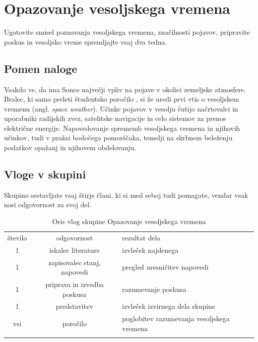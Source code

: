 %
\chapter{Opazovanje vesoljskega vremena }
\label{Vaje:VesVrem} %

Ugotovite smisel poznavanja vesoljskega vremena, značilnosti pojavov, pripravite poskus in vesoljsko vreme spremljajte vsaj dva tedna.

\section{Pomen naloge}
\label{sec:VesVremPomen}
 Vsakdo ve, da ima Sonce največji vpliv na pojave v okolici zemeljske atmosfere. Bralec, ki samo preleti študentsko poročilo \cite{VesVreme_2014}, si že uredi prvi vtis o vesoljskem vremenu (angl.\textit{ space weather}). Učinke pojavov v vesolju čutijo načrtovalci in uporabniki radijskih zvez, satelitske navigacije in celo sistemov za prenos električne energije. Napovedovanje sprememb vesoljskega vremena in njihovih učinkov, tudi v praksi bodočega pomorščaka, temelji na skrbnem beleženju podatkov opažanj in njihovem obdelovanju.   

\section{Vloge v skupini}
\label{sec:VesVrem_Vloge}
Skupino sestavljate vsaj štirje člani, ki si med seboj tudi pomagate, vendar vsak nosi odgovornost za svoj del.

\begin{table}
	\centering
	\caption{Oris vlog skupine Opazovanje vesoljskega vremena}
	\label{tab:VesVremVloge} 
	\begin{tabular}{c|c|l}
		\hline\noalign{\bigskip}
		število & odgovornost & rezultat dela \\
		\noalign{\smallskip}\hline\noalign{\smallskip}
		1 & iskalec literature & izvleček najdenega\\
		1 & zapisovalec stanj, napovedi & pregled uresničitev napovedi \\
		1 & priprava in izvedba poskusa & razumevanje poskusa \\
		1 & predstavitev & izvleček izvirnega dela skupine \\ \hline
		vsi & poročilo & poglobitev razumevanja vesoljskega vremena\\
		\noalign{\smallskip}\hline
	\end{tabular}
\end{table}

